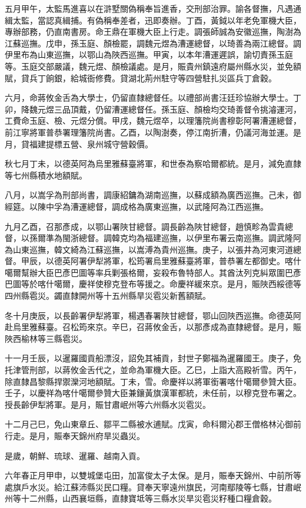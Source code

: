 \begin{pinyinscope}
五月甲午，太監馬進喜以在滸墅關偽稱奉旨進香，交刑部治罪。諭各督撫，凡遇通緝太監，當認真緝捕。有偽稱奉差者，迅即奏辦。丁酉，黃鉞以年老免軍機大臣，專辦部務，仍直南書房。命王鼎在軍機大臣上行走。調張師誠為安徽巡撫，陶澍為江蘇巡撫。戊申，孫玉庭、顏檢罷，調魏元煜為漕運總督，以琦善為兩江總督。調伊里布為山東巡撫，以鄂山為陜西巡撫。甲寅，以本年漕運遲誤，諭切責孫玉庭等。玉庭交部嚴議，魏元煜、顏檢議處。是月，賑貴州鎮遠府屬州縣水災，並免額賦，貸兵丁餉銀，給城衙修費。貸湖北荊州駐守等四營駐扎災區兵丁倉穀。

六月，命蔣攸金舌為大學士，仍留直隸總督任。以禮部尚書汪廷珍協辦大學士。丁卯，降魏元煜三品頂戴，仍留漕運總督任。孫玉庭、顏檢均交琦善督令挑濬運河，工費命玉庭、檢、元煜分償。甲戌，魏元煜卒，以理籓院尚書穆彰阿署漕運總督，前江寧將軍普恭署理籓院尚書。乙酉，以陶澍奏，停江南折漕，仍議河海並運。是月，貸福建提標五營、泉州城守營穀價。

秋七月丁未，以德英阿為烏里雅蘇臺將軍，和世泰為察哈爾都統。是月，減免直隸等七州縣積水地額賦。

八月，以嵩孚為刑部尚書，調康紹鏞為湖南巡撫，以蘇成額為廣西巡撫。己未，御經筵。以陳中孚為漕運總督，調成格為廣東巡撫，以武隆阿為江西巡撫。

九月乙酉，召那彥成，以鄂山署陜甘總督。調長齡為陜甘總督，趙慎畛為雲貴總督，以孫爾準為閩浙總督。調韓克均為福建巡撫，以伊里布署云南巡撫。調武隆阿為山東巡撫，韓文綺為江蘇巡撫，以嵩溥為貴州巡撫。庚子，以張井為河東河道總督。甲辰，以德英阿署伊犁將軍，松筠署烏里雅蘇臺將軍，普恭署左都御史。喀什噶爾幫辦大臣巴彥巴圖等率兵剿張格爾，妄殺布魯特部人。其酋汰列克糾眾圍巴彥巴圖等於喀什噶爾，慶祥使穆克登布等援之。命慶祥緩來京。是月，賑陜西綏德等四州縣雹災。蠲直隸開州等十五州縣旱災雹災新舊額賦。

冬十月庚辰，以長齡署伊犁將軍，楊遇春署陜甘總督，鄂山回陜西巡撫。命德英阿赴烏里雅蘇臺。召松筠來京。辛巳，召蔣攸金舌，以那彥成為直隸總督。是月，賑陜西榆林等三縣雹災。

十一月壬辰，以暹羅國貢船漂沒，詔免其補貢，封世子鄭福為暹羅國王。庚子，免托津管刑部，以蔣攸金舌代之，並命為軍機大臣。乙巳，上詣大高殿祈雪。丙午，除直隸昌黎縣捍禦灤河地額賦。丁未，雪。命慶祥以將軍銜署喀什噶爾參贊大臣。壬子，以慶祥為喀什噶爾參贊大臣兼鑲黃旗漢軍都統，未任前，以穆克登布署之。授長齡伊犁將軍。是月，賑甘肅岷州等六州縣水災雹災。

十二月己巳，免山東章丘、鄒平二縣被水逋賦。戊寅，命科爾沁郡王僧格林沁御前行走。是月，賑奉天錦州府旱災蟲災。

是歲，朝鮮、琉球、暹羅、越南入貢。

六年春正月甲申，以雙城堡屯田，加富俊太子太保。是月，賑奉天錦州、中前所等處旗戶水災。給江蘇沛縣災民口糧。貸奉天寧遠州旗民，河南鄢陵等七縣，甘肅岷州等十二州縣，山西襄垣縣，直隸寶坻等三縣水災旱災雹災籽種口糧倉穀。


\end{pinyinscope}
